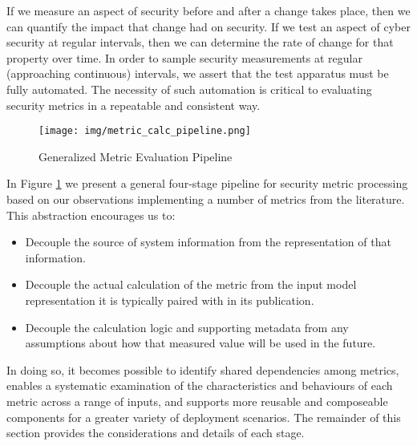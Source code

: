
If we measure an aspect of security before and after a change takes place, then we can quantify the impact that change had on security. If we test an aspect of cyber security at regular intervals, then we can determine the rate of change for that property over time. In order to sample security measurements at regular (approaching continuous) intervals, we assert that the test apparatus must be fully automated. The necessity of such automation is critical to evaluating security metrics in a repeatable and consistent way. 

\begin{figure}[ht]
\centering
\texttt{[image: img/metric\_calc\_pipeline.png]}
\caption{Generalized Metric Evaluation Pipeline}
\label{fig:automation:metric_pipeline}
\end{figure} 

In Figure \ref{fig:automation:metric_pipeline} we present a general four-stage pipeline for security metric processing based on our observations implementing a number of metrics from the literature. This abstraction encourages us to:
\begin{itemize}
\item Decouple the source of system information from the representation of that information. 
\item Decouple the actual calculation of the metric from the input model representation it is typically paired with in its publication. 
\item Decouple the calculation logic and supporting metadata from any assumptions about how that measured value will be used in the future. 
\end{itemize}

In doing so, it becomes possible to identify shared dependencies among metrics, enables a systematic examination of the characteristics and behaviours of each metric across a range of inputs, and supports more reusable and composeable components for a greater variety of deployment scenarios. The remainder of this section provides the considerations and details of each stage.




